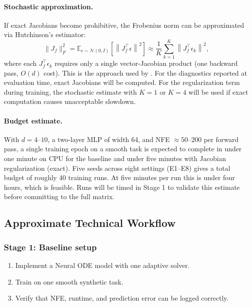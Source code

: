 \documentclass[11pt]{article}
\begin{document}
\paragraph{Stochastic approximation.}
If exact Jacobians become prohibitive, the Frobenius norm can be approximated via Hutchinson's estimator:
\begin{equation}
\|J_f\|_F^2 = \mathbb{E}_{\epsilon \sim \mathcal{N}(0,I)}\left[\left\|J_f^\top \epsilon\right\|^2\right] \approx \frac{1}{K}\sum_{k=1}^{K} \left\|J_f^\top \epsilon_k\right\|^2,
\end{equation}
where each $J_f^\top \epsilon_k$ requires only a single vector-Jacobian product (one backward pass, $O(d)$ cost). This is the approach used by \citet{finlay2020trainnode}. For the diagnostics reported at evaluation time, exact Jacobians will be computed. For the regularization term during training, the stochastic estimate with $K = 1$ or $K = 4$ will be used if exact computation causes unacceptable slowdown.

\paragraph{Budget estimate.}
With $d = 4$--$10$, a two-layer MLP of width 64, and NFE $\approx 50$--$200$ per forward pass, a single training epoch on a smooth task is expected to complete in under one minute on CPU for the baseline and under five minutes with Jacobian regularization (exact). Five seeds across eight settings (E1--E8) gives a total budget of roughly 40 training runs. At five minutes per run this is under four hours, which is feasible. Runs will be timed in Stage 1 to validate this estimate before committing to the full matrix.

\subsection{Approximate Technical Workflow}

\subsubsection{Stage 1: Baseline setup}
\begin{enumerate}[leftmargin=2em]
    \item Implement a Neural ODE model with one adaptive solver.
    \item Train on one smooth synthetic task.
    \item Verify that NFE, runtime, and prediction error can be logged correctly.
\end{enumerate}
\end{document}
